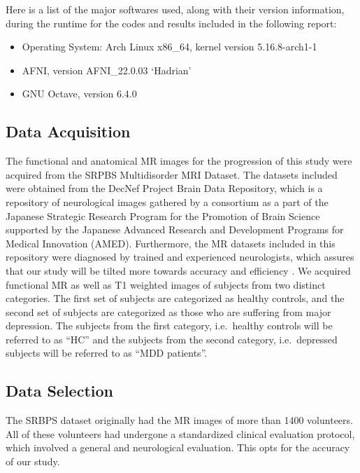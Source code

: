 \documentclass[12pt]{article}
\begin{document}
Here is a list of the major softwares used, along with their version
information, during the runtime for the codes and results included in
the following report:

\begin{itemize}[noitemsep]
  \item Operating System: Arch Linux x86\_64, kernel version
    5.16.8-arch1-1
  \item AFNI, version AFNI\_22.0.03 `Hadrian'
  \item GNU Octave, version 6.4.0


\end{itemize}

\subsection{Data Acquisition}%
\label{sub:data_acquisition}

The functional and anatomical MR images for the progression of this
study were acquired from the SRPBS Multidisorder MRI Dataset. The
datasets included were obtained from the DecNef Project Brain Data
Repository, which is a repository of neurological images gathered by a
consortium as a part of the Japanese Strategic Research Program for
the Promotion of Brain Science supported by the Japanese Advanced
Research and Development Programs for Medical Innovation (AMED).
Furthermore, the MR datasets included in this repository were
diagnosed by trained and experienced neurologists, which assures that
our study will be tilted more towards accuracy and efficiency
\cite{dataset}. We acquired functional MR as well as T1 weighted
images of subjects from two distinct categories. The first set of
subjects are categorized as healthy controls, and the second set of
subjects are categorized as those who are suffering from major
depression. The subjects from the first category, i.e.~healthy
controls will be referred to as ``HC'' and the subjects from the
second category, i.e.~depressed subjects will be referred to as ``MDD
patients''.

\newpage
\subsection{Data Selection}%
\label{sub:data_selection}

The SRBPS dataset originally had the MR images of more than 1400
volunteers. All of these volunteers had undergone a standardized
clinical evaluation protocol, which involved a general and
neurological evaluation. This opts for the accuracy of our study.
\end{document}
